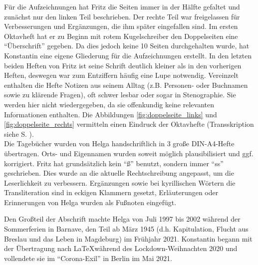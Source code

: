 Für die Aufzeichnungen hat Fritz die Seiten immer in der Hälfte gefaltet und zunächst nur den linken Teil beschrieben. Der rechte Teil war freigelassen für Verbesserungen und Ergänzungen, die ihm später eingefallen sind. Im ersten Oktavheft hat er zu Beginn mit rotem Kugelschreiber den Doppelseiten eine \enquote{Überschrift} gegeben. Da dies jedoch keine 10 Seiten durchgehalten wurde, hat Konstantin eine eigene Gliederung für die Aufzeichnungen erstellt. In den letzten beiden Heften von Fritz ist seine Schrift deutlich kleiner als in den vorherigen Heften, deswegen war zum Entziffern häufig eine Lupe notwendig. Vereinzelt enthalten die Hefte Notizen aus seinem Alltag (z.B. Personen- oder Buchnamen sowie zu klärende Fragen), oft schwer lesbar oder sogar in Stenographie. Sie werden hier nicht wiedergegeben, da sie offenkundig keine relevanten Informationen enthalten. Die Abbildungen \ref{fig:doppelseite_links} und \ref{fig:doppelseite_rechts} vermitteln einen Eindruck der Oktavhefte (Transskription siehe S. \pageref{para:kindheitserinnerungen}).\\

Die Tagebücher wurden von Helga handschriftlich in 3 große DIN-A4-Hefte übertragen. Orts- und Eigennamen wurden soweit möglich plausibilisiert und ggf. korrigiert. Fritz hat grundsätzlich kein \enquote{ß} benutzt, sondern immer \enquote{ss} geschrieben. Dies wurde an die aktuelle Rechtschreibung angepasst, um die Leserlichkeit zu verbessern. Ergänzungen sowie bei kyrillischen Wörtern die Transliteration sind in eckigen Klammern gesetzt, Erläuterungen oder Erinnerungen von Helga wurden als Fußnoten eingefügt.

Den Großteil der Abschrift machte Helga von Juli 1997 bis 2002 während der Sommerferien in Barnave, den Teil ab März 1945 (d.h. Kapitulation, Flucht aus Breslau und das Leben in Magdeburg) im Frühjahr 2021. Konstantin begann mit der Übertragung nach \LaTeX während des Lockdown-Weihnachten 2020 und vollendete sie im \enquote{Corona-Exil} in Berlin im Mai 2021.\\



 \leavevmode \\

